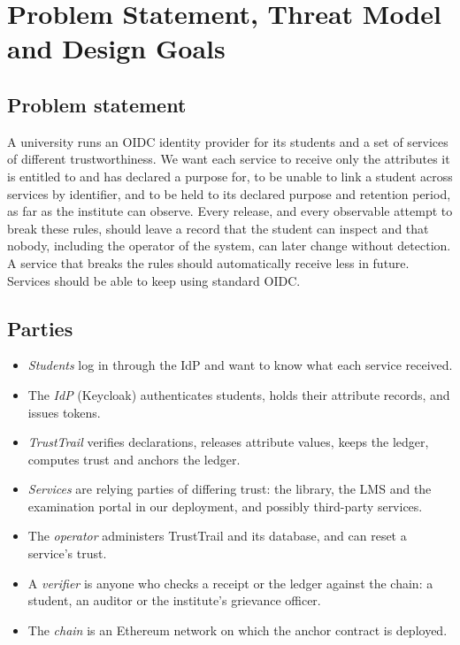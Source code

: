 \section{Problem Statement, Threat Model and Design Goals}
\label{sec:threat}

\subsection{Problem statement}
A university runs an OIDC identity provider for its students and a set of services of different trustworthiness. We want each service to receive only the attributes it is entitled to and has declared a purpose for, to be unable to link a student across services by identifier, and to be held to its declared purpose and retention period, as far as the institute can observe. Every release, and every observable attempt to break these rules, should leave a record that the student can inspect and that nobody, including the operator of the system, can later change without detection. A service that breaks the rules should automatically receive less in future. Services should be able to keep using standard OIDC.

\subsection{Parties}
\begin{itemize}
\item \emph{Students} log in through the IdP and want to know what each service received.
\item The \emph{IdP} (Keycloak) authenticates students, holds their attribute records, and issues tokens.
\item \emph{TrustTrail} verifies declarations, releases attribute values, keeps the ledger, computes trust and anchors the ledger.
\item \emph{Services} are relying parties of differing trust: the library, the LMS and the examination portal in our deployment, and possibly third-party services.
\item The \emph{operator} administers TrustTrail and its database, and can reset a service's trust.
\item A \emph{verifier} is anyone who checks a receipt or the ledger against the chain: a student, an auditor or the institute's grievance officer.
\item The \emph{chain} is an Ethereum network on which the anchor contract is deployed.
\end{itemize}

